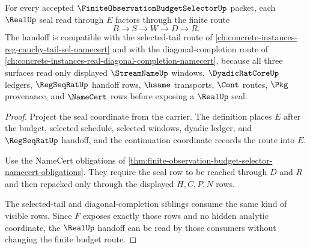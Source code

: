 \begin{theorem}
\label{thm:finite-observation-budget-selector-real-seal-handoff}
For every accepted $\FiniteObservationBudgetSelectorUp$ packet, each $\RealUp$ seal read through $E$ factors through the finite route
$$
B \to S \to W \to D \to R.
$$
The handoff is compatible with the selected-tail route of \autoref{ch:concrete-instances-reg-cauchy-tail-sel-namecert} and with the diagonal-completion route of \autoref{ch:concrete-instances-real-diagonal-completion-namecert}, because all three surfaces read only displayed $\StreamNameUp$ windows, $\DyadicRatCoreUp$ ledgers, $\RegSeqRatUp$ handoff rows, $\hsame$ transports, $\Cont$ routes, $\Pkg$ provenance, and $\NameCert$ rows before exposing a $\RealUp$ seal.
\end{theorem}
\begin{proof}
Project the seal coordinate from the carrier. The definition places $E$ after the budget, selected schedule, selected windows, dyadic ledger, and $\RegSeqRatUp$ handoff, and the continuation coordinate records the route into $E$.

Use the NameCert obligations of \autoref{thm:finite-observation-budget-selector-namecert-obligations}. They require the seal row to be reached through $D$ and $R$ and then repacked only through the displayed $H,C,P,N$ rows.

The selected-tail and diagonal-completion siblings consume the same kind of visible rows. Since $F$ exposes exactly those rows and no hidden analytic coordinate, the $\RealUp$ handoff can be read by those consumers without changing the finite budget route.
\end{proof}

